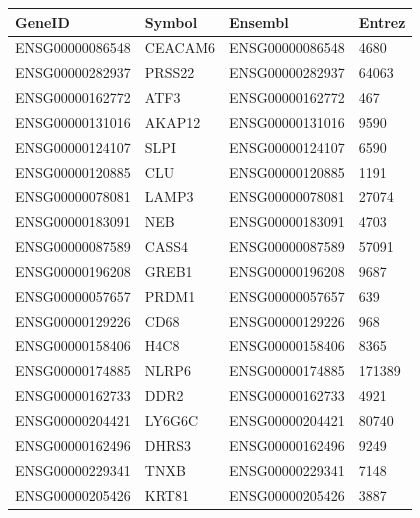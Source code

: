\begingroup
\tiny
\setlength{\tabcolsep}{2pt}
\renewcommand{\arraystretch}{1.18}
\begin{tabular}{@{}llll@{}}
\toprule
GeneID & Symbol & Ensembl & Entrez \\
\midrule
ENSG00000086548 & CEACAM6 & ENSG00000086548 & 4680 \\
ENSG00000282937 & PRSS22 & ENSG00000282937 & 64063 \\
ENSG00000162772 & ATF3 & ENSG00000162772 & 467 \\
ENSG00000131016 & AKAP12 & ENSG00000131016 & 9590 \\
ENSG00000124107 & SLPI & ENSG00000124107 & 6590 \\
ENSG00000120885 & CLU & ENSG00000120885 & 1191 \\
ENSG00000078081 & LAMP3 & ENSG00000078081 & 27074 \\
ENSG00000183091 & NEB & ENSG00000183091 & 4703 \\
ENSG00000087589 & CASS4 & ENSG00000087589 & 57091 \\
ENSG00000196208 & GREB1 & ENSG00000196208 & 9687 \\
ENSG00000057657 & PRDM1 & ENSG00000057657 & 639 \\
ENSG00000129226 & CD68 & ENSG00000129226 & 968 \\
ENSG00000158406 & H4C8 & ENSG00000158406 & 8365 \\
ENSG00000174885 & NLRP6 & ENSG00000174885 & 171389 \\
ENSG00000162733 & DDR2 & ENSG00000162733 & 4921 \\
ENSG00000204421 & LY6G6C & ENSG00000204421 & 80740 \\
ENSG00000162496 & DHRS3 & ENSG00000162496 & 9249 \\
ENSG00000229341 & TNXB & ENSG00000229341 & 7148 \\
ENSG00000205426 & KRT81 & ENSG00000205426 & 3887 \\
\bottomrule
\end{tabular}
\endgroup
